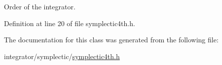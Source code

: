 Order of the integrator. 



Definition at line 20 of file symplectic4th.\+h.



The documentation for this class was generated from the following file\+:\begin{DoxyCompactItemize}
\item 
integrator/symplectic/\mbox{\hyperlink{symplectic4th_8h}{symplectic4th.\+h}}\end{DoxyCompactItemize}
